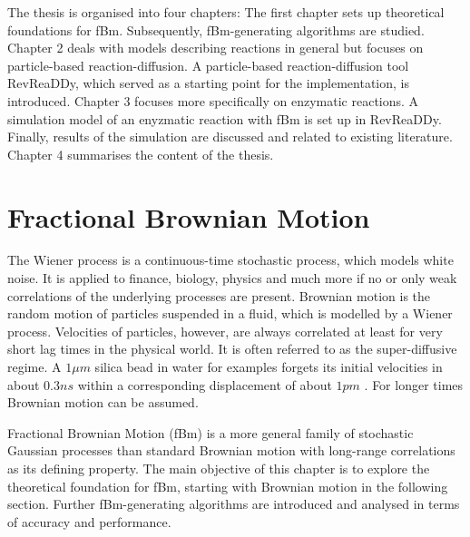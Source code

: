 \documentclass[
  a4paper,BCOR10mm,twoside,
  headsepline,footsepline,%
  fleqn,openbib
]{scrbook}
\begin{document}
\par The thesis is organised into four chapters: The first chapter sets up theoretical foundations for fBm. Subsequently, fBm-generating algorithms are studied. Chapter 2 deals with models describing reactions in general but focuses on particle-based reaction-diffusion. A particle-based reaction-diffusion tool RevReaDDy, which served as a starting point for the implementation, is introduced.  Chapter 3 focuses more specifically on enzymatic reactions. A simulation model of an enyzmatic reaction with fBm is set up in RevReaDDy. Finally, results of the simulation are discussed and related to existing literature. Chapter 4 summarises the content of the thesis. 
\chapter{Fractional Brownian Motion}
The Wiener process is a continuous-time stochastic process, which models white noise. It is applied to finance, biology, physics and much more if no or only weak correlations of the underlying processes are present. Brownian motion is the random motion of particles suspended in a fluid, which is modelled by a Wiener process. Velocities of particles, however, are always correlated at least for very short lag times in the physical world. It is often referred to as the super-diffusive regime. A $1 \mu m $  silica bead in water for examples forgets its initial velocities in about $0.3ns$ within a corresponding displacement of about $1pm$ \cite{Huang2011}. For longer times Brownian motion can be assumed.\par
Fractional Brownian Motion (fBm) is a more general family of stochastic Gaussian processes than standard Brownian motion with long-range correlations as its defining property. The main objective of this chapter is to explore the theoretical foundation for fBm, starting with Brownian motion in the following section. Further fBm-generating algorithms are introduced and analysed in terms of accuracy and performance.    
\end{document}
